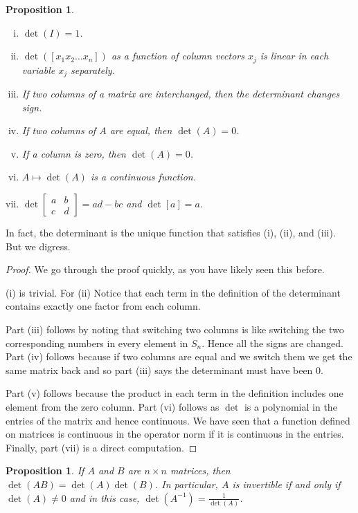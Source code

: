 \documentclass[12pt]{book}
\theoremstyle{plain}
\newtheorem{prop}[thm]{Proposition}
\theoremstyle{remark}
\theoremstyle{definition}
\theoremstyle{exercise}
\theoremstyle{example}
\begin{document}
\begin{prop}
{\ }
\begin{enumerate}[(i)]
\item $\det(I) = 1$.
\item $\det([x_1 x_2 \ldots x_n ])$ as a function of column vectors $x_j$
is linear in each variable $x_j$ separately.
\item If two columns of a matrix are interchanged, then the determinant changes
sign.
\item If two columns of $A$ are equal, then $\det(A) = 0$.
\item If a column is zero, then $\det(A) = 0$.
\item $A \mapsto \det(A)$ is a continuous function.
\item $\det\left[\begin{smallmatrix} a & b \\ c &d \end{smallmatrix}\right]
= ad-bc$ and $\det [a] = a$.
\end{enumerate}
\end{prop}

In fact, the determinant is the unique function that satisfies (i), (ii), and
(iii).
But we digress.

\begin{proof}
We go through the proof quickly, as you have likely seen this before.

(i) is trivial.  For (ii) Notice that each term in the definition of the
determinant contains exactly one factor from each column.

Part (iii) follows by noting that switching two columns is like switching the
two corresponding numbers in every element in $S_n$.  Hence all the signs
are changed.
Part (iv) follows because if two columns are equal and we switch them we get
the same matrix back and so part (iii) says the determinant must have been
0.

Part (v) follows because the product in each term in the definition includes
one element from the zero column.
Part (vi) follows as $\det$ is a polynomial in the entries of the matrix
and hence continuous.  We have seen that a function defined on
matrices is continuous in the operator norm if it is 
continuous in the entries.
Finally, part (vii) is a direct computation.
\end{proof}

\begin{prop}
If $A$ and $B$ are $n\times n$ matrices, then $\det(AB) = \det(A)\det(B)$.
In particular, $A$ is invertible if and only if $\det(A) \not= 0$ and in
this case, $\det(A^{-1}) = \frac{1}{\det(A)}$.
\end{prop}
\end{document}
